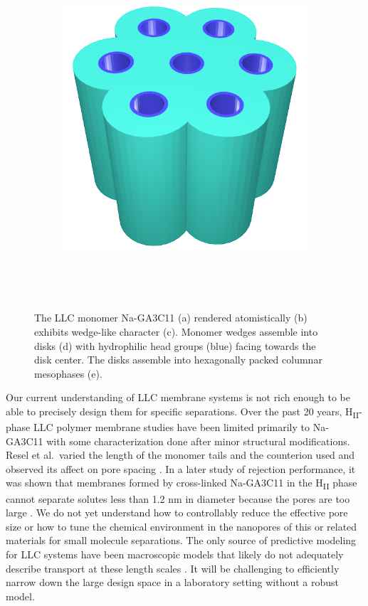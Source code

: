 \documentclass[journal=jpcbfk,manusciprt=article]{achemso}
\begin{document}
\begin{figure}
\begin{subfigure}{0.4\linewidth}
		\caption{}~\label{fig:wedge_layer}
	\end{subfigure}
	\begin{subfigure}{0.4\linewidth}
		\centering
		\includegraphics[width=\textwidth]{hexagonal_packing.png}
		\caption{}~\label{fig:hex_packing_simple}
	\end{subfigure}
	\caption{The LLC monomer Na-GA3C11 (a) rendered atomistically (b)
	exhibits wedge-like character (c). Monomer wedges assemble into disks (d) with
	hydrophilic head groups (blue) facing towards the disk center. The disks
	assemble into hexagonally packed columnar mesophases (e).}~\label{fig:assembly}
  \end{figure}

  Our current understanding of LLC membrane systems is not rich enough to be
  able to precisely design them for specific separations. Over the past 20 years,
  H\textsubscript{II}-phase LLC polymer membrane studies have been limited
  primarily to Na-GA3C11 with some characterization done after minor structural
  modifications. Resel et al.~varied the length of the monomer tails and the
  counterion used and observed its affect on pore spacing
  \cite{resel_structural_2000}. In a later study of rejection performance, it was
  shown that membranes formed by cross-linked Na-GA3C11 in the
  H\textsubscript{II} phase cannot separate solutes less than 1.2 nm in diameter
  because the pores are too large \cite{zhou_supported_2005}. We do not yet
  understand how to controllably reduce the effective pore size or how to tune
  the chemical environment in the nanopores of this or related materials for
  small molecule separations. The only source of predictive modeling for LLC
  systems have been macroscopic models that likely do not adequately describe
  transport at these length scales \cite{hatakeyama_water_2011}. It will be
  challenging to efficiently narrow down the large design space in a laboratory
  setting without a robust model.
\end{document}
